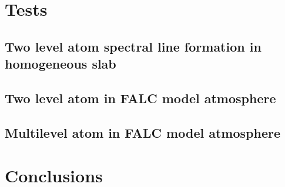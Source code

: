 \documentclass[referee]{aa}
\begin{document}
 

\section{Tests}

\subsection{Two level atom spectral line formation in homogeneous slab}

\subsection{Two level atom in FALC model atmosphere}

\subsection{Multilevel atom in FALC model atmosphere}

\section{Conclusions}

 



\end{document}
